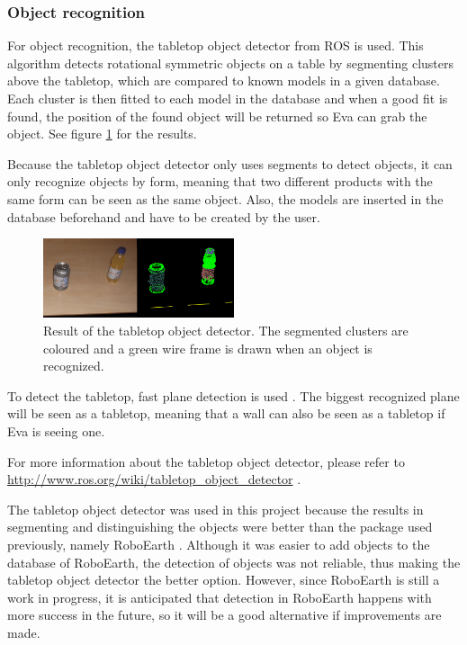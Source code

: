 \documentclass[project_eva.tex]{subfiles}
\begin{document}
\subsubsection*{Object recognition}
For object recognition, the tabletop object detector from ROS is used. This algorithm detects rotational symmetric 
objects on a table by segmenting clusters above the tabletop, which are compared to known models in a given database. 
Each cluster is then fitted to each model in the database and when a good fit is found, the position of the found object 
will be returned so Eva can grab the object. See figure \ref{fig:tabletop} for the results.

Because the tabletop object detector only uses segments to detect objects, it can only recognize objects by form, meaning 
that two different products with the same form can be seen as the same object. Also, the models are inserted in the 
database beforehand and have to be created by the user.

\begin{figure}[h]
	\centering
	\mbox{\includegraphics[width=0.5\textwidth]{Images/object_detector.png}}
	\caption{Result of the tabletop object detector. The segmented clusters are coloured and a green wire frame is drawn 
	when an object is recognized.}
	\label{fig:tabletop}
\end{figure}

To detect the tabletop, fast plane detection is used \cite{plane}. The biggest recognized plane will be seen as a 
tabletop, meaning that a wall can also be seen as a 
tabletop if Eva is seeing one.

For more information about the tabletop object detector, please refer to 
\url{http://www.ros.org/wiki/tabletop\_object\_detector} \cite{tabletop}.

The tabletop object detector was used in this project because the results in segmenting and distinguishing the objects 
were better than the package used previously, namely RoboEarth \cite{Roboearth}. Although it was easier to add objects to 
the database of RoboEarth, the detection of objects was not reliable, thus making the tabletop object detector the 
better option. However, since RoboEarth is still a work in progress, it is anticipated that detection in RoboEarth 
happens with more success in the future, so it will be a good alternative if improvements are made.
\end{document}
